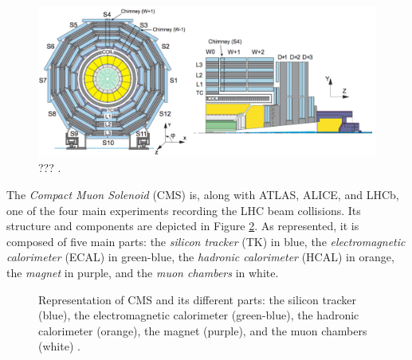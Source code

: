     \begin{figure}[h!]
      \centering
      \includegraphics[width=\textwidth]{img/I-3-cms/muon-numbering.png}
      \caption{??? \cite{Chatrchyan:2009si}.}
      \label{fig:I-3-cms-muon-numbering}
    \end{figure}
























\newcommand{\GeVc}{GeV c$ ^{-1} $}
\newcommand{\um}{$ \mu $m}
\newcommand{\us}{$ \mu $s}
\newcommand{\pT}{$ p_T $}
\newcommand{\pZ}{$ p_Z $}
\newcommand{\axis}[1]{#1}

		The \emph{Compact Muon Solenoid} (CMS) \Cite{CMS_at_LHC} is, along with ATLAS, ALICE, and LHCb, one of the four main experiments recording the LHC beam collisions. Its structure and components are depicted in Figure \ref{fig:lhc_and_cms__cms_global_view}. As represented, it is composed of five main parts: the \emph{silicon tracker} (TK) in blue, the \emph{electromagnetic calorimeter} (ECAL) in green-blue, the \emph{hadronic calorimeter} (HCAL) in orange, the \emph{magnet} in purple, and the \emph{muon chambers} in white. \\

		\begin{figure}[h!]
			\centering
			\caption{Representation of CMS and its different parts: the silicon tracker (blue), the electromagnetic calorimeter (green-blue), the hadronic calorimeter (orange), the magnet (purple), and the muon chambers (white) \Cite{Fig:cms-detector-design}.}
			\label{fig:lhc_and_cms__cms_global_view}
		\end{figure}

